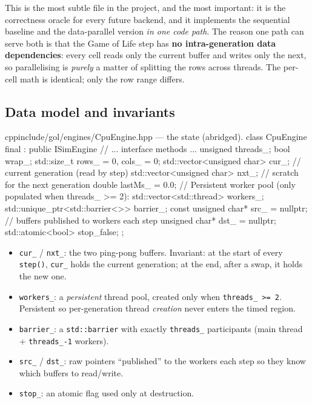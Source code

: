 \documentclass[
	english,
	letterpaper, oneside
]{article}
\begin{document}
This is the most subtle file in the project, and the most important: it is the
correctness oracle for every future backend, and it implements the sequential
baseline and the data-parallel version \emph{in one code path}. The reason one
path can serve both is that the Game of Life step has \textbf{no
intra-generation data dependencies}: every cell reads only the current buffer and
writes only the next, so parallelising is \emph{purely} a matter of splitting the
rows across threads. The per-cell math is identical; only the row range differs.

\subsection{Data model and invariants}

\begin{sourcecode}{cpp}{include/gol/engines/CpuEngine.hpp --- the state (abridged).}
class CpuEngine final : public ISimEngine {
  // ... interface methods ...
  unsigned threads_;  bool wrap_;
  std::size_t rows_ = 0, cols_ = 0;
  std::vector<unsigned char> cur_;   // current generation (read by step)
  std::vector<unsigned char> nxt_;   // scratch for the next generation
  double lastMs_ = 0.0;
  // Persistent worker pool (only populated when threads_ >= 2):
  std::vector<std::thread> workers_;
  std::unique_ptr<std::barrier<>> barrier_;
  const unsigned char* src_ = nullptr;   // buffers published to workers each step
  unsigned char* dst_ = nullptr;
  std::atomic<bool> stop_{false};
};
\end{sourcecode}

\begin{itemize}
	\item \texttt{cur\_} / \texttt{nxt\_}: the two ping-pong buffers. Invariant:
	      at the start of every \texttt{step()}, \texttt{cur\_} holds the current
	      generation; at the end, after a swap, it holds the new one.
	\item \texttt{workers\_}: a \emph{persistent} thread pool, created only when
	      \texttt{threads\_ >= 2}. Persistent so per-generation thread
	      \emph{creation} never enters the timed region.
	\item \texttt{barrier\_}: a \texttt{std::barrier} with exactly
	      \texttt{threads\_} participants (main thread + \texttt{threads\_-1}
	      workers).
	\item \texttt{src\_} / \texttt{dst\_}: raw pointers ``published'' to the
	      workers each step so they know which buffers to read/write.
	\item \texttt{stop\_}: an atomic flag used only at destruction.
\end{itemize}
\end{document}
